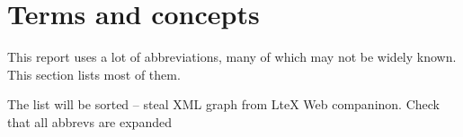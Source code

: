 
\chapter{Terms and concepts}
\label{cha:terms-and-concepts}



This report uses a lot of abbreviations, many of which may not be
widely known.  This section lists most of them.


\textsf{The list will be sorted -- steal XML graph from LteX Web
  companinon.  Check that all abbrevs are expanded}

